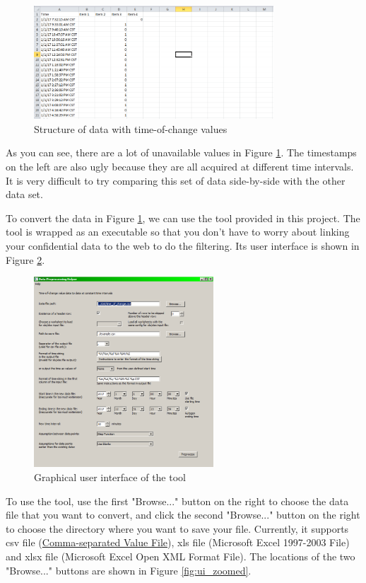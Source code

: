 \documentclass[12pt,a4paper]{article}
\begin{document}
\begin{figure}[H]
\centering
\includegraphics[width=0.8\textwidth]{time-of-change.png}
\caption{Structure of data with time-of-change values}
\label{fig:ugly_file}
\end{figure}

As you can see, there are a lot of unavailable values in Figure \ref{fig:ugly_file}.
The timestamps on the left are also ugly because they are all acquired at different time intervals.
It is very difficult to try comparing this set of data side-by-side with the other data set.

To convert the data in Figure \ref{fig:ugly_file}, we can use the tool provided in this project.
The tool is wrapped as an executable so that you don't have to worry about linking your confidential data to the web to do the filtering.
Its user interface is shown in Figure \ref{fig:ui}.

\begin{figure}[H]
\centering
\includegraphics[width=0.6\textwidth]{ui.png}
\caption{Graphical user interface of the tool}
\label{fig:ui}
\end{figure}

To use the tool, use the first "Browse..." button on the right to choose the data file that you want to convert, and click the second "Browse..." button on the right to choose the directory where you want to save your file. Currently, it supports csv file (\href{https://en.wikipedia.org/wiki/Comma-separated_values}{Comma-separated Value File}), xls file (Microsoft Excel 1997-2003 File) and xlsx file (Microsoft Excel Open XML Format File). The locations of the two "Browse..." buttons are shown in Figure \ref{fig:ui_zoomed}.
\end{document}
